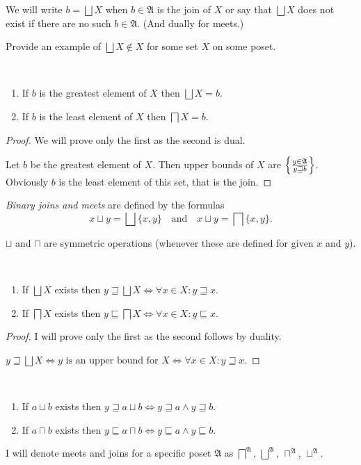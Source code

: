 We will write $b=\bigsqcup X$ when $b\in\mathfrak{A}$ is the join
of $X$ or say that $\bigsqcup X$ does not exist if there are no
such $b\in\mathfrak{A}$. (And dually for meets.)
\begin{xca}
Provide an example of $\bigsqcup X\notin X$ for some set $X$ on
some poset.\end{xca}
\begin{prop}
~
\begin{enumerate}
\item If $b$ is the greatest element of $X$ then $\bigsqcup X=b$.
\item If $b$ is the least element of $X$ then $\bigsqcap X=b$.
\end{enumerate}
\end{prop}
\begin{proof}
We will prove only the first as the second is dual.

Let $b$ be the greatest element of $X$. Then upper bounds of $X$
are $\left\{ \frac{y\in\mathfrak{A}}{y\sqsupseteq b}\right\}$. Obviously $b$
is the least element of this set, that is the join.\end{proof}
\begin{defn}
\emph{Binary joins and meets} are defined by the
formulas
\[
x\sqcup y=\bigsqcup\{x,y\}\quad\text{and}\quad x\sqcup y=\bigsqcap\{x,y\}.
\]
\end{defn}
\begin{obvious}
$\sqcup$ and $\sqcap$ are symmetric operations (whenever these are
defined for given $x$ and $y$).\end{obvious}
\begin{thm}
~
\begin{enumerate}
\item If $\bigsqcup X$ exists then $y\sqsupseteq\bigsqcup X\Leftrightarrow\forall x\in X:y\sqsupseteq x$.
\item If $\bigsqcap X$ exists then $y\sqsubseteq\bigsqcap X\Leftrightarrow\forall x\in X:y\sqsubseteq x$.
\end{enumerate}
\end{thm}
\begin{proof}
I will prove only the first as the second follows by duality.

$y\sqsupseteq\bigsqcup X\Leftrightarrow y\text{ is an upper bound for }X\Leftrightarrow\forall x\in X:y\sqsupseteq x$.
\end{proof}
\begin{cor}
~
\begin{enumerate}
\item If $a\sqcup b$ exists then $y\sqsupseteq a\sqcup b\Leftrightarrow y\sqsupseteq a\land y\sqsupseteq b$.
\item If $a\sqcap b$ exists then $y\sqsubseteq a\sqcap b\Leftrightarrow y\sqsubseteq a\land y\sqsubseteq b$.
\end{enumerate}
\end{cor}
I will denote meets and joins for a specific poset $\mathfrak{A}$
as $\bigsqcap^{\mathfrak{A}}$, $\bigsqcup^{\mathfrak{A}}$, $\sqcap^{\mathfrak{A}}$,
$\sqcup^{\mathfrak{A}}$.


